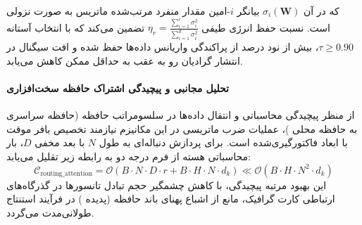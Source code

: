 که در آن $\sigma_i(\mathbf{W})$ بیانگر $i$-امین مقدار منفرد مرتب‌شده ماتریس به صورت نزولی است. نسبت حفظ انرژی طیفی $\eta_r = \frac{\sum_{i=1}^r \sigma_i^2}{\sum_{i=1}^{d} \sigma_i^2}$ تضمین می‌کند که با انتخاب آستانه $\tau \ge 0.90$، بیش از نود درصد از پراکندگی واریانس داده‌ها حفظ شده و افت سیگنال در انتشار گرادیان رو به عقب به حداقل ممکن کاهش می‌یابد.

\paragraph{تحلیل مجانبی و پیچیدگی اشتراک حافظه سخت‌افزاری}
از منظر پیچیدگی محاسباتی و انتقال داده‌ها در سلسومراتب حافظه (حافظه سراسری  به حافظه محلی )، عملیات ضرب ماتریسی در این مکانیزم نیازمند تخصیص بافر موقت با ابعاد فاکتورگیری‌شده است. برای پردازش دنباله‌ای به طول $N$ با بعد مخفی $D$، بار محاسباتی هسته از فرم درجه دو به رابطه زیر تقلیل می‌یابد:
\begin{equation}
\label{eq:complexity_routing_attention}
\mathcal{C}_{\text{routing\_attention}} = \mathcal{O}\left( B \cdot N \cdot D \cdot r + B \cdot H \cdot N \cdot d_k \right) \ll \mathcal{O}\left( B \cdot H \cdot N^2 \cdot d_k \right)
\end{equation}
این بهبود مرتبه پیچیدگی، با کاهش چشمگیر حجم تبادل تانسورها در گذرگاه‌های ارتباطی کارت گرافیک، مانع از اشباع پهنای باند حافظه (پدیده ) در فرآیند استنتاج طولانی‌مدت می‌گردد.